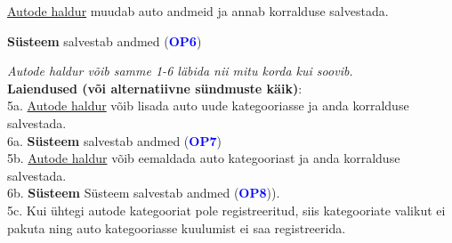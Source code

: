 \begin{shaded}
\begin{myenumerate}
		\item \underline{Autode haldur} muudab auto andmeid ja annab korralduse salvestada.
		\item \textbf{Süsteem} salvestab andmed (\textbf{\textcolor{blue}{OP6}})
	\end{myenumerate}
	\textit{Autode haldur võib samme 1-6 läbida nii mitu korda kui soovib.} \\
	\textbf{Laiendused  (või alternatiivne sündmuste käik)}: \\
	\indent 5a. \underline{Autode haldur} võib lisada auto uude kategooriasse ja anda korralduse salvestada. \\
	\indent 6a. \textbf{Süsteem} salvestab andmed (\textbf{\textcolor{blue}{OP7}}) \\
	\indent 5b. \underline{Autode haldur} võib eemaldada auto kategooriast ja anda korralduse salvestada. \\
	\indent 6b. \textbf{Süsteem} Süsteem salvestab andmed (\textbf{\textcolor{blue}{OP8}})).  \\
	\indent 5c. Kui ühtegi autode kategooriat pole registreeritud, siis kategooriate valikut ei pakuta ning auto kategooriasse kuulumist ei saa registreerida. \\
\end{shaded}

